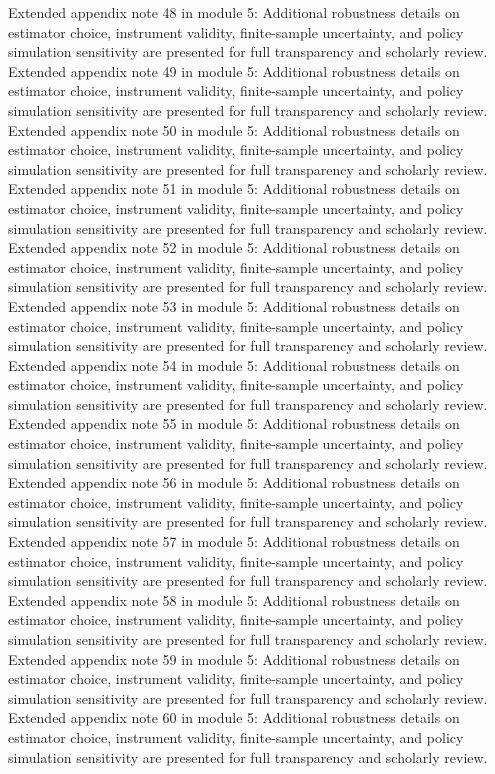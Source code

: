 \documentclass[preprint,12pt]{elsarticle}
\begin{document}
Extended appendix note 48 in module 5: Additional robustness details on estimator choice, instrument validity, finite-sample uncertainty, and policy simulation sensitivity are presented for full transparency and scholarly review.
Extended appendix note 49 in module 5: Additional robustness details on estimator choice, instrument validity, finite-sample uncertainty, and policy simulation sensitivity are presented for full transparency and scholarly review.
Extended appendix note 50 in module 5: Additional robustness details on estimator choice, instrument validity, finite-sample uncertainty, and policy simulation sensitivity are presented for full transparency and scholarly review.
Extended appendix note 51 in module 5: Additional robustness details on estimator choice, instrument validity, finite-sample uncertainty, and policy simulation sensitivity are presented for full transparency and scholarly review.
Extended appendix note 52 in module 5: Additional robustness details on estimator choice, instrument validity, finite-sample uncertainty, and policy simulation sensitivity are presented for full transparency and scholarly review.
Extended appendix note 53 in module 5: Additional robustness details on estimator choice, instrument validity, finite-sample uncertainty, and policy simulation sensitivity are presented for full transparency and scholarly review.
Extended appendix note 54 in module 5: Additional robustness details on estimator choice, instrument validity, finite-sample uncertainty, and policy simulation sensitivity are presented for full transparency and scholarly review.
Extended appendix note 55 in module 5: Additional robustness details on estimator choice, instrument validity, finite-sample uncertainty, and policy simulation sensitivity are presented for full transparency and scholarly review.
Extended appendix note 56 in module 5: Additional robustness details on estimator choice, instrument validity, finite-sample uncertainty, and policy simulation sensitivity are presented for full transparency and scholarly review.
Extended appendix note 57 in module 5: Additional robustness details on estimator choice, instrument validity, finite-sample uncertainty, and policy simulation sensitivity are presented for full transparency and scholarly review.
Extended appendix note 58 in module 5: Additional robustness details on estimator choice, instrument validity, finite-sample uncertainty, and policy simulation sensitivity are presented for full transparency and scholarly review.
Extended appendix note 59 in module 5: Additional robustness details on estimator choice, instrument validity, finite-sample uncertainty, and policy simulation sensitivity are presented for full transparency and scholarly review.
Extended appendix note 60 in module 5: Additional robustness details on estimator choice, instrument validity, finite-sample uncertainty, and policy simulation sensitivity are presented for full transparency and scholarly review.
\end{document}
